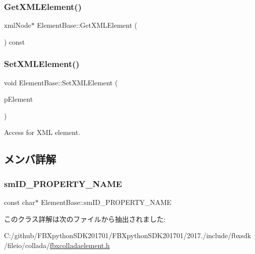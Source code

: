 \subsubsection{\texorpdfstring{Get\+X\+M\+L\+Element()}{GetXMLElement()}}
{\footnotesize\ttfamily xml\+Node$\ast$ Element\+Base\+::\+Get\+X\+M\+L\+Element (\begin{DoxyParamCaption}{ }\end{DoxyParamCaption}) const}

\mbox{\label{class_element_base_a7d2be8b683fab79fab4c45aaf484f18c}} 
\subsubsection{\texorpdfstring{Set\+X\+M\+L\+Element()}{SetXMLElement()}}
{\footnotesize\ttfamily void Element\+Base\+::\+Set\+X\+M\+L\+Element (\begin{DoxyParamCaption}\item[{xml\+Node $\ast$}]{p\+Element }\end{DoxyParamCaption})}

Access for X\+ML element. 

\subsection{メンバ詳解}
\mbox{\label{class_element_base_a9f75c1fda20fcc3c553e18c36be8221b}} 
\subsubsection{\texorpdfstring{sm\+I\+D\+\_\+\+P\+R\+O\+P\+E\+R\+T\+Y\+\_\+\+N\+A\+ME}{smID\_PROPERTY\_NAME}}
{\footnotesize\ttfamily const char$\ast$ Element\+Base\+::sm\+I\+D\+\_\+\+P\+R\+O\+P\+E\+R\+T\+Y\+\_\+\+N\+A\+ME\hspace{0.3cm}{\ttfamily [static]}}



このクラス詳解は次のファイルから抽出されました\+:\begin{DoxyCompactItemize}
\item 
C\+:/github/\+F\+B\+Xpython\+S\+D\+K201701/\+F\+B\+Xpython\+S\+D\+K201701/2017./include/fbxsdk/fileio/collada/\hyperlink{fbxcolladaelement_8h}{fbxcolladaelement.\+h}\end{DoxyCompactItemize}

